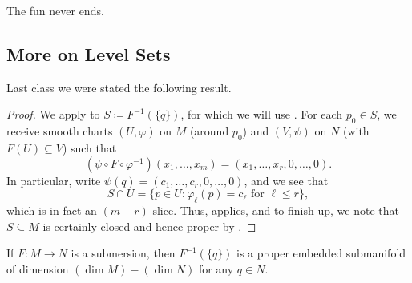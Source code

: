 \documentclass[../notes.tex]{subfiles}
\begin{document}
The fun never ends.

\subsection{More on Level Sets}
Last class we were stated the following result.
\levelsubthm*
\begin{proof}
	We apply  to $S\coloneqq F^{-1}(\{q\})$, for which we will use . For each $p_0\in S$, we receive smooth charts $(U,\varphi)$ on $M$ (around $p_0$) and $(V,\psi)$ on $N$ (with $F(U)\subseteq V$) such that
	\[\left(\psi\circ F\circ\varphi^{-1}\right)(x_1,\ldots,x_m)=(x_1,\ldots,x_r,0,\ldots,0).\]
	In particular, write $\psi(q)=(c_1,\ldots,c_r,0,\ldots,0)$, and we see that
	\[S\cap U=\{p\in U:\varphi_\ell(p)=c_\ell\text{ for }\ell\le r\},\]
	which is in fact an $(m-r)$-slice. Thus,  applies, and to finish up, we note that $S\subseteq M$ is certainly closed and hence proper by .
\end{proof}
\begin{example} \label{ex:submersion-level-set}
	If $F\colon M\to N$ is a submersion, then $F^{-1}(\{q\})$ is a proper embedded submanifold of dimension $(\dim M)-(\dim N)$ for any $q\in N$.
\end{example}
\end{document}
